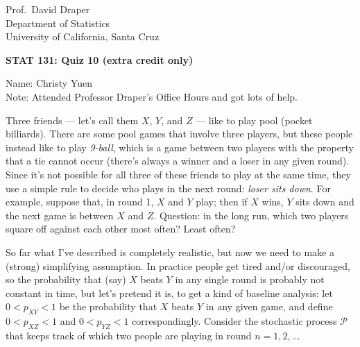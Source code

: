 \documentclass[12pt]{article}
\begin{document}
\vspace*{-0.3in}

\begin{flushleft}

Prof.~David Draper \\
Department of Statistics \\
University of California, Santa Cruz

\end{flushleft}

\begin{center}

\textbf{\large STAT 131: Quiz 10 (extra credit only)} 

\end{center}

\bigskip

\begin{flushleft}

Name: Christy Yuen \\
Note: Attended Professor Draper's Office Hours and got lots of help.

\end{flushleft}

Three friends --- let's call them $X$, $Y$, and $Z$ --- like to play pool (pocket billiards). There are some pool games that involve three players, but these people instead like to play \textit{9-ball}, which is a game between two players with the property that a tie cannot occur (there's always a winner and a loser in any given round). Since it's not possible for all three of these friends to play at the same time, they use a simple rule to decide who plays in the next round: \textit{loser sits down}. For example, suppose that, in round 1, $X$ and $Y$ play; then if $X$ wins, $Y$ sits down and the next game is between $X$ and $Z$. Question: in the long run, which two players square off against each other most often? Least often?

So far what I've described is completely realistic, but now we need to make a (strong) simplifying assumption. In practice people get tired and/or discouraged, so the probability that (say) $X$ beats $Y$ in any single round is probably not constant in time, but let's pretend it is, to get a kind of baseline analysis: let $0 < p_{ X Y } < 1$ be the probability that $X$ beats $Y$ in any given game, and define $0 < p_{ X Z } < 1$ and $0 < p_{ Y Z } < 1$ correspondingly. Consider the stochastic process $\mathcal{ P }$ that keeps track of which two people are playing in round $n = 1, 2, \dots$
\end{document}
